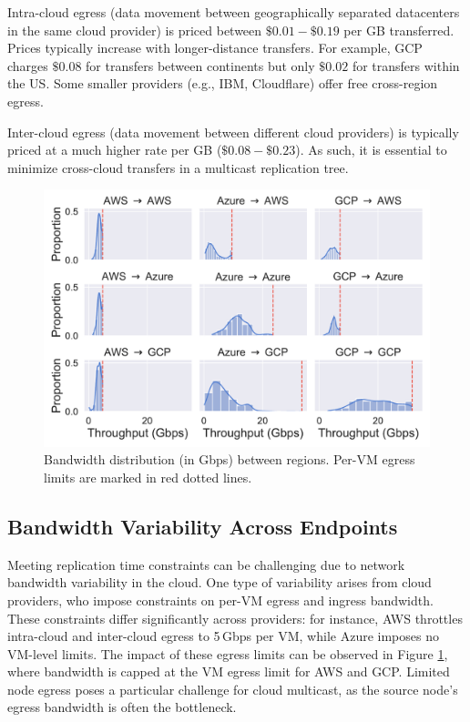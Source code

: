 Intra-cloud egress (data movement between geographically separated datacenters in the same cloud provider)
is priced between $\$0.01-\$0.19$ per GB transferred.
% 
Prices typically increase with longer-distance transfers.
% 
For example, GCP charges $\$0.08$ for transfers between continents but only $\$0.02$ for transfers within the US.
% 
Some smaller providers (e.g., IBM, Cloudflare) offer free cross-region egress.

Inter-cloud egress (data movement between different cloud providers) is typically priced at a much higher rate per GB ($\$0.08-\$0.23$).
% 
As such, it is essential to minimize cross-cloud transfers in a multicast replication tree.

\begin{figure}[tbp]
     \centering
     \includegraphics[width=0.9\linewidth]{figures/3-3-throughput-histograms-no-share-x.pdf}
     \caption{Bandwidth distribution (in Gbps) between regions. Per-VM egress limits are marked in red dotted lines.} %
     \label{fig:tp_hist}
\end{figure}

\subsection{Bandwidth Variability Across Endpoints}
\label{ss:bandwidth-variability}
Meeting replication time constraints can be challenging due to network bandwidth variability in the cloud.
One type of variability arises from cloud providers, who impose constraints on per-VM egress and ingress bandwidth.
These constraints differ significantly across providers:
for instance, AWS throttles intra-cloud and inter-cloud egress to 5\,Gbps per VM, while Azure imposes no VM-level limits.
The impact of these egress limits can be observed in Figure \ref{fig:tp_hist}, where bandwidth is capped at the VM egress limit for AWS and GCP.
Limited node egress poses a particular challenge for cloud multicast, as the source node's egress bandwidth is often the bottleneck.


